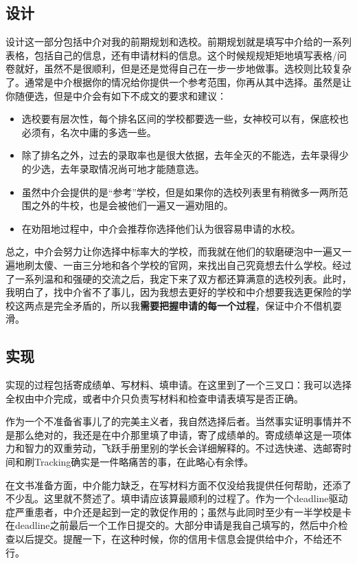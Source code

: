 \subsection{设计}
设计这一部分包括中介对我的前期规划和选校。前期规划就是填写中介给的一系列表格，包括自己的信息，还有申请材料的信息。这个时候规规矩矩地填写表格/问卷就好，虽然不是很顺利，但是还是觉得自己在一步一步地做事。选校则比较复杂了。通常是中介根据你的情况给你提供一个参考范围，你再从其中选择。虽然是让你随便选，但是中介会有如下不成文的要求和建议：
\begin{itemize}
\item 选校要有层次性，每个排名区间的学校都要选一些，女神校可以有，保底校也必须有，名次中庸的多选一些。
\item 除了排名之外，过去的录取率也是很大依据，去年全灭的不能选，去年录得少的少选，去年录取情况尚可地才能随意选。
\item 虽然中介会提供的是“参考”学校，但是如果你的选校列表里有稍微多一两所范围之外的牛校，也是会被他们一遍又一遍劝阻的。
\item 在劝阻地过程中，中介会推荐你选择他们认为很容易申请的水校。
\end{itemize}\par
总之，中介会努力让你选择中标率大的学校，而我就在他们的软磨硬泡中一遍又一遍地刷太傻、一亩三分地和各个学校的官网，来找出自己究竟想去什么学校。经过了一系列温和和强硬的交流之后，我定下来了双方都还算满意的选校列表。此时，我明白了，找中介省不了事儿，因为我想去更好的学校和中介想要我选更保险的学校这两点是完全矛盾的，所以我\textbf{需要把握申请的每一个过程}，保证中介不借机耍滑。

\subsection{实现}
实现的过程包括寄成绩单、写材料、填申请。在这里到了一个三叉口：我可以选择全权由中介完成，或者中介只负责写材料和检查申请表填写是否正确。\par
作为一个不准备省事儿了的完美主义者，我自然选择后者。当然事实证明事情并不是那么绝对的，我还是在中介那里填了申请，寄了成绩单的。寄成绩单这是一项体力和智力的双重劳动，飞跃手册里别的学长会详细解释的。不过选快递、选邮寄时间和刷Tracking确实是一件略痛苦的事，在此略心有余悸。\par
在文书准备方面，中介能力缺乏，在写材料方面不仅没给我提供任何帮助，还添了不少乱。这里就不赘述了。填申请应该算最顺利的过程了。作为一个deadline驱动症严重患者，中介还是起到一定的敦促作用的；虽然与此同时至少有一半学校是卡在deadline之前最后一个工作日提交的。大部分申请是我自己填写的，然后中介检查以后提交。提醒一下，在这种时候，你的信用卡信息会提供给中介，不给还不行。\par

